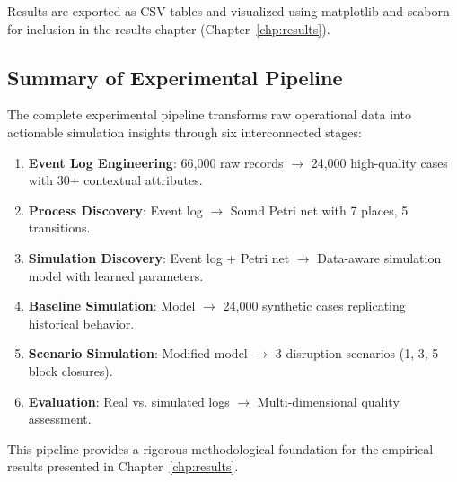         Results are exported as CSV tables and visualized using matplotlib and seaborn for inclusion in the results chapter (Chapter~\ref{chp:results}).

\subsection{Summary of Experimental Pipeline}

The complete experimental pipeline transforms raw operational data into actionable simulation insights through six interconnected stages:

\begin{enumerate}
    \item \textbf{Event Log Engineering}: 66,000 raw records $\rightarrow$ 24,000 high-quality cases with 30+ contextual attributes.
    \item \textbf{Process Discovery}: Event log $\rightarrow$ Sound Petri net with 7 places, 5 transitions.
    \item \textbf{Simulation Discovery}: Event log + Petri net $\rightarrow$ Data-aware simulation model with learned parameters.
    \item \textbf{Baseline Simulation}: Model $\rightarrow$ 24,000 synthetic cases replicating historical behavior.
    \item \textbf{Scenario Simulation}: Modified model $\rightarrow$ 3 disruption scenarios (1, 3, 5 block closures).
    \item \textbf{Evaluation}: Real vs. simulated logs $\rightarrow$ Multi-dimensional quality assessment.
\end{enumerate}

This pipeline provides a rigorous methodological foundation for the empirical results presented in Chapter~\ref{chp:results}.